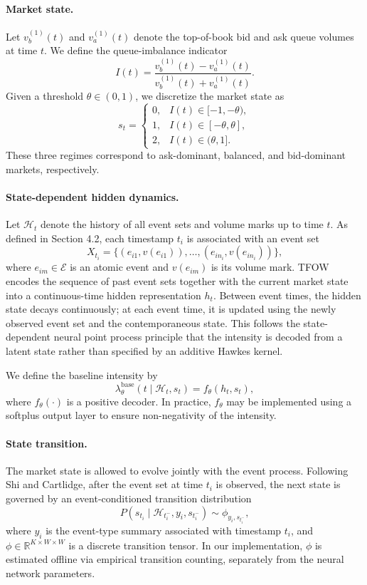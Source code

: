 \paragraph{Market state.}
Let \(v_b^{(1)}(t)\) and \(v_a^{(1)}(t)\) denote the top-of-book bid and ask queue volumes at time \(t\). We define the queue-imbalance indicator
\[
I(t)=\frac{v_b^{(1)}(t)-v_a^{(1)}(t)}{v_b^{(1)}(t)+v_a^{(1)}(t)}.
\]
Given a threshold \(\theta \in (0,1)\), we discretize the market state as
\[
s_t=
\begin{cases}
0, & I(t)\in[-1,-\theta),\\[2mm]
1, & I(t)\in[-\theta,\theta],\\[2mm]
2, & I(t)\in(\theta,1].
\end{cases}
\]
These three regimes correspond to ask-dominant, balanced, and bid-dominant markets, respectively.

\paragraph{State-dependent hidden dynamics.}
Let \(\mathcal H_t\) denote the history of all event sets and volume marks up to time \(t\). As defined in Section 4.2, each timestamp \(t_i\) is associated with an event set
\[
X_{t_i}=\{(e_{i1},v(e_{i1})),\dots,(e_{in_i},v(e_{in_i}))\},
\]
where \(e_{im}\in \mathcal{E} \) is an atomic event and \(v(e_{im})\) is its volume mark. TFOW encodes the sequence of past event sets together with the current market state into a continuous-time hidden representation \(h_t\). Between event times, the hidden state decays continuously; at each event time, it is updated using the newly observed event set and the contemporaneous state. This follows the state-dependent neural point process principle that the intensity is decoded from a latent state rather than specified by an additive Hawkes kernel.

We define the baseline intensity by
\[
\lambda_{\theta}^{\mathrm{base}}(t \mid \mathcal H_t, s_t)
=
f_{\theta}(h_t,s_t),
\]
where \(f_{\theta}(\cdot)\) is a positive decoder. In practice, \(f_{\theta}\) may be implemented using a softplus output layer to ensure non-negativity of the intensity.

\paragraph{State transition.}
The market state is allowed to evolve jointly with the event process. Following Shi and Cartlidge, after the event set at time \(t_i\) is observed, the next state is governed by an event-conditioned transition distribution
\[
P(s_{t_i}\mid \mathcal H_{t_i^-}, y_i, s_{t_i^-}) \sim \phi_{y_i,s_{t_i^-}},
\]
where \(y_i\) is the event-type summary associated with timestamp \(t_i\), and \(\phi\in\mathbb R^{K\times W\times W}\) is a discrete transition tensor. In our implementation, \(\phi\) is estimated offline via empirical transition counting, separately from the neural network parameters.

